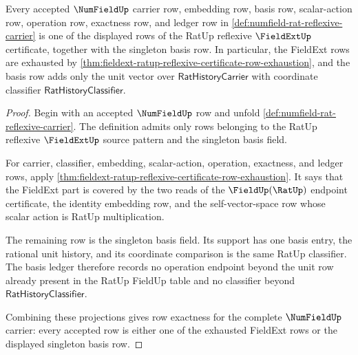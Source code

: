 \begin{theorem}
\label{thm:numfield-rat-reflexive-ledger-exactness}
Every accepted $\NumFieldUp$ carrier row, embedding row, basis row,
scalar-action row, operation row, exactness row, and ledger row in
\autoref{def:numfield-rat-reflexive-carrier} is one of the displayed rows of
the RatUp reflexive $\FieldExtUp$ certificate, together with the singleton
basis row. In particular, the FieldExt rows are exhausted by
\autoref{thm:fieldext-ratup-reflexive-certificate-row-exhaustion}, and the
basis row adds only the unit vector over $\mathsf{RatHistoryCarrier}$ with
coordinate classifier $\mathsf{RatHistoryClassifier}$.
\end{theorem}
\begin{proof}
Begin with an accepted $\NumFieldUp$ row and unfold
\autoref{def:numfield-rat-reflexive-carrier}. The definition admits only rows
belonging to the RatUp reflexive $\FieldExtUp$ source pattern and the singleton
basis field.

For carrier, classifier, embedding, scalar-action, operation, exactness, and
ledger rows, apply
\autoref{thm:fieldext-ratup-reflexive-certificate-row-exhaustion}. It says
that the FieldExt part is covered by the two reads of the
$\FieldUp(\RatUp)$ endpoint certificate, the identity embedding row, and the
self-vector-space row whose scalar action is RatUp multiplication.

The remaining row is the singleton basis field. Its support has one basis
entry, the rational unit history, and its coordinate comparison is the same
RatUp classifier. The basis ledger therefore records no operation endpoint
beyond the unit row already present in the RatUp FieldUp table and no
classifier beyond $\mathsf{RatHistoryClassifier}$.

Combining these projections gives row exactness for the complete
$\NumFieldUp$ carrier: every accepted row is either one of the exhausted
FieldExt rows or the displayed singleton basis row.
\end{proof}
